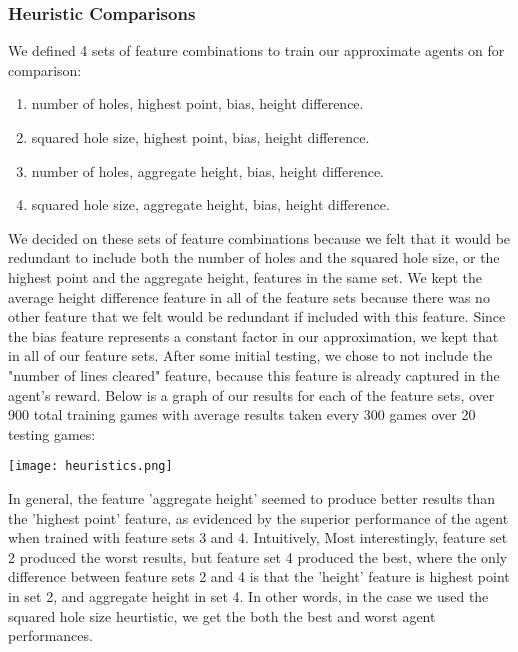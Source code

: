\documentclass[11pt]{article}
\begin{document}
\subsubsection{Heuristic Comparisons}
We defined 4 sets of feature combinations to train our approximate agents on for comparison:
\begin{enumerate}
    \item number of holes, highest point, bias, height difference.
    \item squared hole size, highest point, bias, height difference.
    \item number of holes, aggregate height, bias, height difference.
    \item squared hole size, aggregate height, bias, height difference.
\end{enumerate}
We decided on these sets of feature combinations because we felt that it would be redundant to include both the number of holes and the squared hole size, or the highest point and the aggregate height, features in the same set. We kept the average height difference feature in all of the feature sets because there was no other feature that we felt would be redundant if included with this feature. Since the bias feature represents a constant factor in our approximation, we kept that in all of our feature sets. After some initial testing, we chose to not include the "number of lines cleared" feature, because this feature is already captured in the agent's reward. Below is a graph of our results for each of the feature sets, over 900 total training games with average results taken every 300 games over 20 testing games:
\begin{center}
    \texttt{[image: heuristics.png]}
\end{center}

In general, the feature 'aggregate height' seemed to produce better results than the 'highest point' feature, as evidenced by the superior performance of the agent when trained with feature sets 3 and 4. Intuitively, Most interestingly, feature set 2 produced the worst results, but feature set 4 produced the best, where the only difference between feature sets 2 and 4 is that the 'height' feature is highest point in set 2, and aggregate height in set 4. In other words, in the case we used the squared hole size heurtistic, we get the both the best and worst agent performances.
\end{document}
